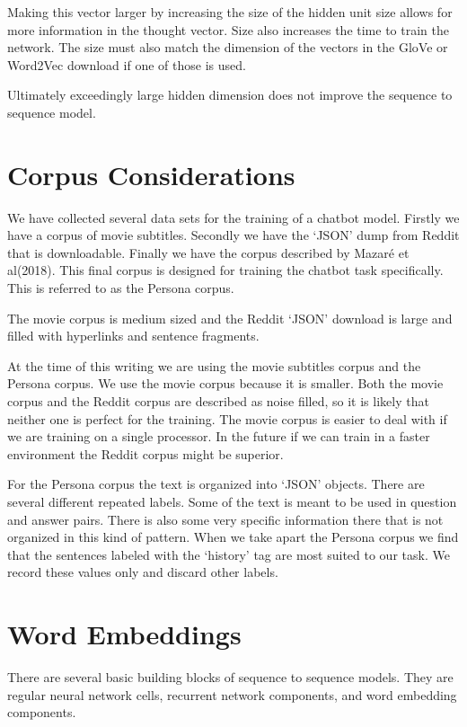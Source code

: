 Making this vector larger by increasing the size of the hidden unit
size allows for more information in the thought vector. Size also
increases the time to train the network. The size must also match
the dimension of the vectors in the GloVe or Word2Vec download if
one of those is used. 

Ultimately exceedingly large hidden dimension does not improve the
sequence to sequence model. 



\section{Corpus Considerations}
We have collected several data sets for the training of a chatbot model. Firstly we have a corpus of movie subtitles.
Secondly we have the `JSON' dump from Reddit that is downloadable. Finally
we have the corpus described by Mazar{\'{e}} et al(2018)\cite{DBLP:journals/corr/abs-1809-01984}.
This final corpus is designed for training the chatbot task specifically. This is 
referred to as the Persona corpus.

The movie corpus is medium sized and the Reddit `JSON' download is large
and filled with hyperlinks and sentence fragments. 

At the time of
this writing we are using the movie subtitles corpus and the Persona corpus. We use the movie
corpus because it is smaller. Both the movie corpus and the Reddit
corpus are described as noise filled, so it is likely that neither
one is perfect for the training. The movie corpus is easier to deal
with if we are training on a single processor. In the future if we
can train in a faster environment the Reddit corpus might be superior.

For the Persona corpus the text is organized into `JSON' objects. There
are several different repeated labels. Some of the text is meant to be used in question and answer pairs. There is also some very specific information there that is not
organized in this kind of pattern. When we take apart the Persona corpus
we find that the sentences labeled with the `history' tag are most suited to our task.
We record these values only and discard other labels.



\section{Word Embeddings}

There are several basic building blocks of sequence to sequence models. 
They are regular neural network cells, recurrent
network components, and word embedding components.

